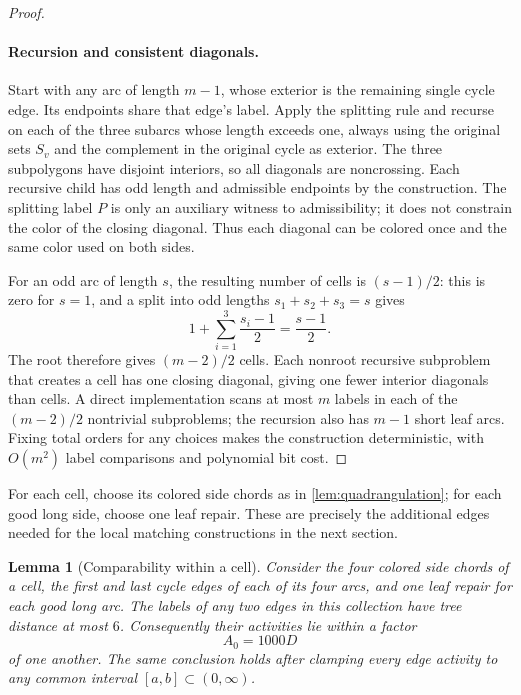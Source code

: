 \documentclass[11pt]{article}
\newtheorem{lemma}[theorem]{Lemma}
\theoremstyle{definition}
\theoremstyle{remark}
\numberwithin{equation}{section}
\begin{document}
\begin{proof}
\paragraph{Recursion and consistent diagonals.}
Start with any arc of length $m-1$, whose exterior is the remaining
single cycle edge.  Its endpoints share that edge's label.
Apply the splitting rule and recurse on each of the three subarcs
whose length exceeds one, always using the original sets $S_v$ and
the complement in the original cycle as exterior.  The three
subpolygons have disjoint interiors, so all diagonals are noncrossing.
Each recursive child has odd length and admissible endpoints by the
construction.  The splitting label $P$ is only an auxiliary witness
to admissibility; it does not constrain the color of the closing
diagonal.  Thus each diagonal can be colored once and the same color
used on both sides.

For an odd arc of length $s$, the resulting number of cells is
$(s-1)/2$: this is zero for $s=1$, and a split into odd lengths
$s_1+s_2+s_3=s$ gives
\[
 1+\sum_{i=1}^{3}\frac{s_i-1}{2}=\frac{s-1}{2}.
\]
The root therefore gives $(m-2)/2$ cells.  Each nonroot recursive
subproblem that creates a cell has one closing diagonal, giving one
fewer interior diagonals than cells. A direct implementation scans
at most $m$ labels in each of the $(m-2)/2$ nontrivial subproblems;
the recursion also has $m-1$ short leaf arcs. Fixing total orders for
any choices makes the construction deterministic, with $O(m^2)$
label comparisons and polynomial bit cost.
\end{proof}

For each cell, choose its colored side chords as in
\cref{lem:quadrangulation}; for each good long side, choose one leaf
repair.  These are precisely the additional edges needed for the
local matching constructions in the next section.

\begin{lemma}[Comparability within a cell]
\label{lem:cell-comparability}
Consider the four colored side chords of a cell, the first and last
cycle edges of each of its four arcs, and one leaf repair for each
good long arc.  The labels of any two edges in this collection have
tree distance at most $6$.  Consequently their activities lie within
a factor
\[
 A_0=1000D
\]
of one another.  The same conclusion holds after clamping every edge
activity to any common interval $[a,b]\subset(0,\infty)$.
\end{lemma}
\end{document}
